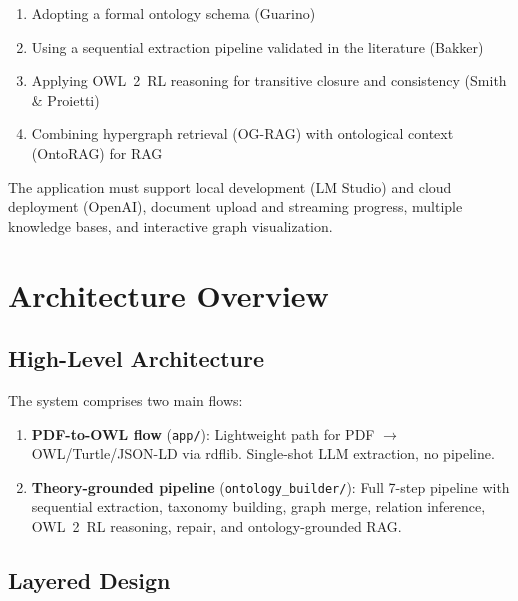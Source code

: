 \documentclass[11pt,a4paper]{article}
\begin{document}
\begin{enumerate}[noitemsep]
    \item Adopting a formal ontology schema (Guarino)
    \item Using a sequential extraction pipeline validated in the literature (Bakker)
    \item Applying OWL~2~RL reasoning for transitive closure and consistency (Smith \& Proietti)
    \item Combining hypergraph retrieval (OG-RAG) with ontological context (OntoRAG) for RAG
\end{enumerate}

The application must support local development (LM Studio) and cloud deployment (OpenAI), document upload and streaming progress, multiple knowledge bases, and interactive graph visualization.

\section{Architecture Overview}

\subsection{High-Level Architecture}

The system comprises two main flows:

\begin{enumerate}
    \item \textbf{PDF-to-OWL flow} (\texttt{app/}): Lightweight path for PDF $\rightarrow$ OWL/Turtle/JSON-LD via rdflib. Single-shot LLM extraction, no pipeline.
    \item \textbf{Theory-grounded pipeline} (\texttt{ontology\_builder/}): Full 7-step pipeline with sequential extraction, taxonomy building, graph merge, relation inference, OWL~2~RL reasoning, repair, and ontology-grounded RAG.
\end{enumerate}

\subsection{Layered Design}
\end{document}
